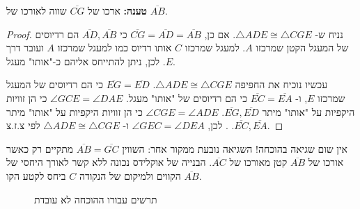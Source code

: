 \textbf{טענה:}
ארכו של 
$\overline{CG}$
שווה לאורכו של
$\overline{AB}$.

\begin{proof}
נניח ש-%
$\triangle ADE\cong \triangle CGE$.
אם כן, 
$\overline{CG}=\overline{AD}=\overline{AB}$
כי 
$\overline{AD},\overline{AB}$
הם רדיוסים של המעגל הקטן שמרכזו 
$A$.
למעגל שמרכזו
$C$
אותו רדיוס כמו למעגל שמרכזו 
$A$
ועובר דרך 
$E$.
לכן, ניתן להתייחס אליהם כ-"אותו" מעגל.

עכשיו נוכיח את החפיפה
$\triangle ADE\cong \triangle CGE$.
$\overline{EG}=\overline{ED}$
כי הם רדיוסים של המעגל שמרכזו
$E$,
ו-%
$\overline{EC}=\overline{EA}$
כי הם רדיוסים של "אותו" מעגל. 
$\angle GCE=\angle DAE$
כי הן זוויות היקפיות על "אותו" מיתר 
$\overline{EG},\overline{ED}$.
 $\angle CGE=\angle ADE$
כי הן זוויות היקפיות על "אותו" מיתר
$\overline{EC},\overline{EA}$.
. לכן,
$\angle GEC=\angle DEA$
ו-%
$\triangle ADE\cong \triangle CGE$
לפי צ.ז.צ.
\end{proof}

אין שום שגיאה בהוכחה! השגיאה נובעת ממקור אחר: השווין
$\overline{AB}=\overline{GC}$
מתקיים רק כאשר אורכו של 
$\overline{AB}$
קטן מאורכו של
$\overline{AC}$.
הבנייה של אוקלידס נכונה ללא קשר לאורך היחסי של הקווים ולמיקום של הנקודה
$C$
ביחס לקטע הקו
$\overline{AB}$.

\begin{figure}[htb]
\begin{center}
\caption{תרשים עבורו ההוכחה לא עובדת}\label{f.collapse-incorrect-4}
\end{center}
\end{figure}


